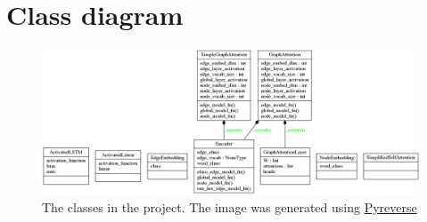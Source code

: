 \section{Class diagram}
\begin{figure}[!ht]
	\centering
	\includegraphics[width=150mm, keepaspectratio]{figures/classes_GraphTransformations.png}
	\caption{The classes in the project. The image was generated using \href{https://www.logilab.org/blogentry/6883}{Pyreverse}}
	\label{fig:classes}
\end{figure}



